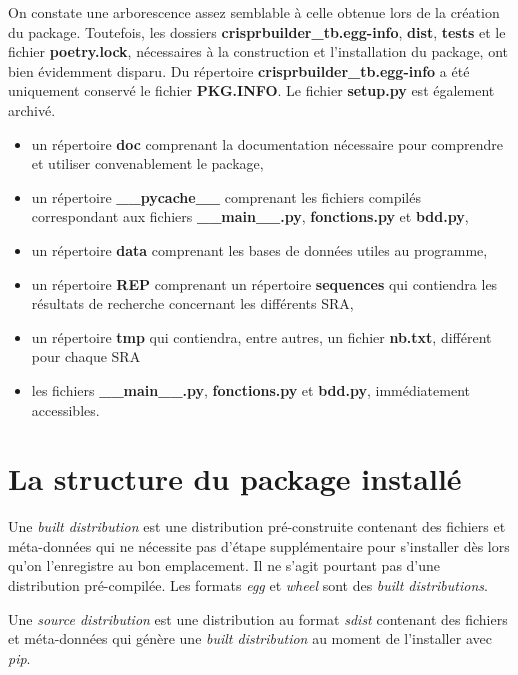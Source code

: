 \documentclass[twoside,a4paper,11pt,frenchb,openany]{report}
\begin{document}
On constate une arborescence assez semblable à celle obtenue lors de la création du package. Toutefois, les dossiers \textbf{crisprbuilder\_tb.egg-info}, \textbf{dist}, \textbf{tests} et le fichier \textbf{poetry.lock}, nécessaires à la construction et l'installation du package, ont bien évidemment disparu. Du répertoire \textbf{crisprbuilder\_tb.egg-info} a été uniquement conservé le fichier \textbf{PKG.INFO}. Le fichier \textbf{setup.py} est également archivé.

\begin{itemize}
\item un répertoire \textbf{doc} comprenant la documentation nécessaire pour comprendre et utiliser convenablement le package,
\item un répertoire \textbf{\_\_pycache\_\_} comprenant les fichiers compilés correspondant aux fichiers \textbf{\_\_main\_\_.py}, \textbf{fonctions.py} et \textbf{bdd.py},
\item un répertoire \textbf{data} comprenant les bases de données utiles au programme,
\item un répertoire \textbf{REP} comprenant un répertoire \textbf{sequences} qui contiendra les résultats de recherche concernant les différents SRA,
\item un répertoire \textbf{tmp} qui contiendra, entre autres, un fichier \textbf{nb.txt}, différent pour chaque SRA
\item les fichiers \textbf{\_\_main\_\_.py}, \textbf{fonctions.py} et \textbf{bdd.py}, immédiatement accessibles.
\end{itemize}





\section{La structure du package installé}

Une \textit{built distribution} est une distribution pré-construite contenant des fichiers et méta-données qui ne nécessite pas d'étape supplémentaire pour s'installer dès lors qu'on l'enregistre au bon emplacement. Il ne s'agit pourtant pas d'une distribution pré-compilée. Les formats \textit{egg} et \textit{wheel} sont des \textit{built distributions}.

Une \textit{source distribution} est une distribution au format \textit{sdist} contenant des fichiers et méta-données qui génère une \textit{built distribution} au moment de l'installer avec \textit{pip}.
\end{document}
